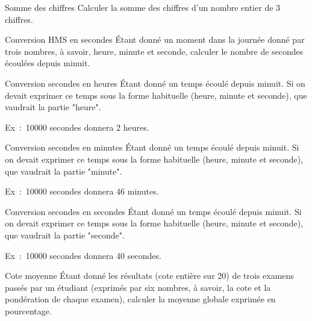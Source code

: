		\begin{Exercice}{Somme des chiffres}
			Calculer la somme des chiffres
			d’un nombre entier de 3 chiffres.
		\end{Exercice}
	
		\begin{Exercice}{Conversion HMS en secondes}
			Étant donné un moment dans la journée donné
			par trois nombres, à savoir, heure, minute et seconde, calculer le
			nombre de secondes écoulées depuis minuit.
		\end{Exercice}
	
		\begin{Exercice}{Conversion secondes en heures}
			Étant donné un temps écoulé depuis minuit.
			Si on devait exprimer ce temps sous la forme
			habituelle (heure, minute et seconde),
			que vaudrait la partie "heure".
	
			Ex~:~10000 secondes donnera 2 heures.
		\end{Exercice}
	
		\begin{Exercice}{Conversion secondes en minutes}
			Étant donné un temps écoulé depuis minuit.
			Si on devait exprimer ce temps sous la forme
			habituelle (heure, minute et seconde),
			que vaudrait la partie "minute".
	
			Ex~:~10000 secondes donnera 46 minutes.
		\end{Exercice}
	
		\begin{Exercice}{Conversion secondes en secondes}
			Étant donné un temps écoulé depuis minuit.
			Si on devait exprimer ce temps sous la forme
			habituelle (heure, minute et seconde),
			que vaudrait la partie "seconde".
	
			Ex~:~10000 secondes donnera 40 secondes.
		\end{Exercice}	
	
		\begin{Exercice}{Cote moyenne}
			Étant donné les résultats (cote entière sur
			20) de trois examens passés par un étudiant (exprimés par six nombres,
			à savoir, la cote et la pondération de chaque examen), calculer 
			la moyenne globale exprimée en pourcentage.
		\end{Exercice}
